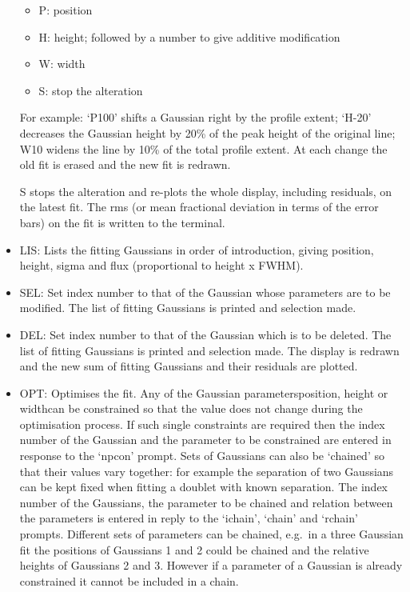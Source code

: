 \begin{itemize}
\begin{itemize}
\item P: position
\item H: height; followed by a number to give additive modification
\item W: width
\item S: stop the alteration
\end{itemize}

   For example: `P100' shifts a Gaussian right by the profile extent;
   `H-20' decreases the Gaussian height by 20\% of the peak height of the
   original line; W10 widens the line by 10\% of the total profile
   extent. At each change the old fit is erased and the new fit is
   redrawn.

   S stops the alteration and re-plots the whole display, including
   residuals, on the latest fit. The rms (or mean fractional deviation
   in terms of the error bars) on the fit is written to the terminal.

\item
   LIS: Lists the fitting Gaussians in order of introduction, giving
   position, height, sigma and flux (proportional to height x FWHM).

\item
   SEL: Set index number to that of the Gaussian whose parameters are
   to be modified. The list of fitting Gaussians is printed and
   selection made.

\item
   DEL: Set index number to that of the Gaussian which is to be deleted.
   The list of fitting Gaussians is printed and selection made. The
   display is redrawn and the new sum of fitting Gaussians and their
   residuals are plotted.

\item
   OPT: Optimises the fit. Any of the Gaussian
   parameters\latorhtm{---}{-}position, height or
   width\latorhtm{---}{-}can be constrained so that the value does not
   change during the optimisation process. If such single constraints
   are required then the index number of the Gaussian and the parameter
   to be constrained are entered in response to the `npcon' prompt. Sets
   of Gaussians can also be `chained' so that their values vary
   together: for example the separation of two Gaussians can be kept
   fixed when fitting a doublet with known separation. The index number
   of the Gaussians, the parameter to be chained and relation between
   the parameters is entered in reply to the `ichain', `chain' and
   `rchain' prompts. Different sets of parameters can be chained, e.g.\
   in a three Gaussian fit the positions of Gaussians 1 and 2 could be
   chained and the relative heights of Gaussians 2 and 3.  However if a
   parameter of a Gaussian is already constrained it cannot be included
   in a chain.


\end{itemize}
